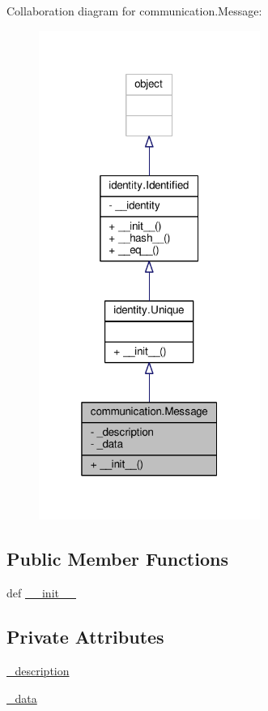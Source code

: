 Collaboration diagram for communication.\+Message\+:\nopagebreak
\begin{figure}[H]
\begin{center}
\leavevmode
\includegraphics[width=205pt]{classcommunication_1_1Message__coll__graph}
\end{center}
\end{figure}
\subsection*{Public Member Functions}
\begin{DoxyCompactItemize}
\item 
def \hyperlink{classcommunication_1_1Message_a62b3404331858b0d5d543365896ea9d2}{\+\_\+\+\_\+init\+\_\+\+\_\+}
\end{DoxyCompactItemize}
\subsection*{Private Attributes}
\begin{DoxyCompactItemize}
\item 
\hyperlink{classcommunication_1_1Message_ad840c310a6e64814c848d98bfc29da36}{\+\_\+description}
\item 
\hyperlink{classcommunication_1_1Message_a8fe4f1f09629c4edf328939167b1892c}{\+\_\+data}
\end{DoxyCompactItemize}


